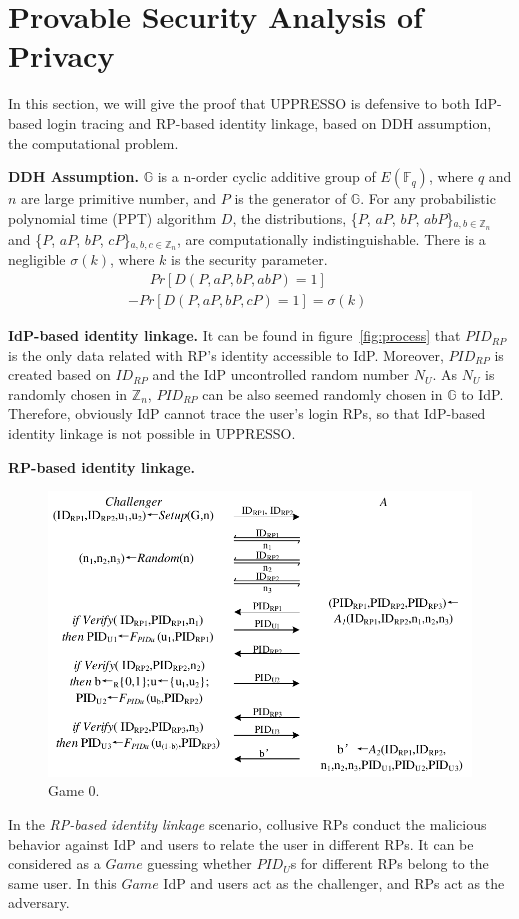 \section{Provable Security Analysis of Privacy}
\label{sec:privacy}


In this section, we will give the proof that UPPRESSO is defensive to both IdP-based login tracing and RP-based identity linkage, based on DDH assumption\cite{GoldwasserK16}, the computational problem. 


\noindent\textbf{DDH Assumption.}
$\mathbb{G}$ is a n-order  cyclic additive group of $E(\mathbb{F}_q)$, where $q$ and $n$ are large primitive number, and $P$ is the generator of $\mathbb{G}$.  For any probabilistic polynomial time (PPT) algorithm $D$, the distributions, \{$P$, $aP$, $bP$, $abP$\}$_{a,b \in \mathbb{Z}_n}$ and \{$P$, $aP$, $bP$, $cP$\}$_{a,b,c \in \mathbb{Z}_n}$, are computationally indistinguishable. There is a negligible $\sigma(k)$, where $k$ is the security parameter. 
\begin{multline*}
    \ \ \ \ \ \ \ Pr[D(P, aP, bP, abP)=1]\\-Pr[D(P, aP, bP, cP)=1]=\sigma(k)\ \ \ \ \ \ \ \ 
\end{multline*}

\noindent\textbf{IdP-based identity linkage.} 
It can be found in figure~\ref{fig:process} that $PID_{RP}$ is the only data related with RP's identity accessible to IdP. Moreover, $PID_{RP}$ is created based on $ID_{RP}$ and the IdP uncontrolled random number $N_U$. As $N_U$ is randomly chosen in $\mathbb{Z}_n$,  $PID_{RP}$ can be also seemed  randomly chosen in $\mathbb{G}$ to IdP. Therefore, obviously IdP cannot trace the user's login RPs, so that IdP-based identity linkage is not possible in UPPRESSO.

\noindent\textbf{RP-based identity linkage.} 

\begin{figure}[t]
  \centering
  \includegraphics[width=1\linewidth]{fig/game0.pdf}
  \caption{Game 0.}
  \label{fig:game0}
\end{figure}
In the \emph{RP-based identity linkage} scenario, collusive RPs conduct the malicious behavior against IdP and users to relate the user in different RPs. It can be considered as a $Game$ guessing whether $PID_U$s for different RPs belong to the same user.  In this $Game$ IdP and users act as the challenger, and RPs act as the adversary. 

